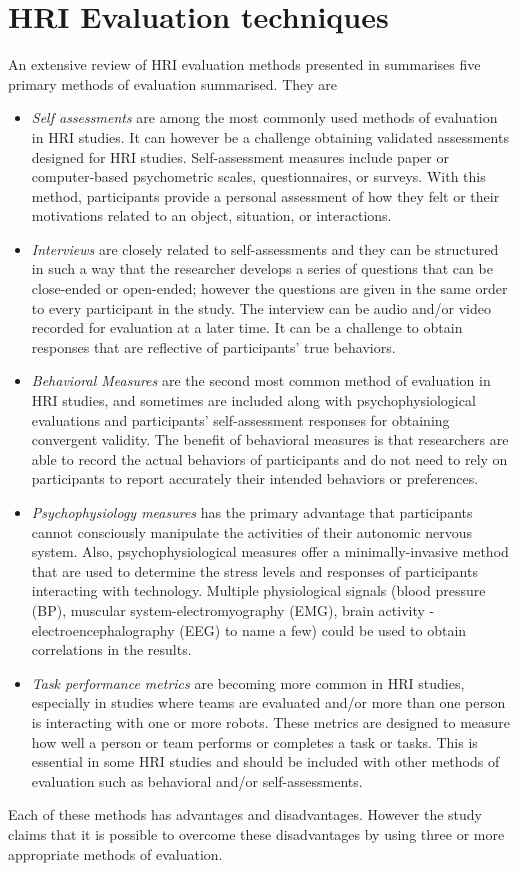 {\section{HRI Evaluation techniques}
	An extensive review of HRI evaluation methods presented in \cite{Bethel2010} summarises five primary methods of evaluation summarised. They are
\begin{itemize}
\item \emph{Self assessments} are among the most commonly used methods of evaluation in HRI studies. It can however be a challenge obtaining validated assessments designed for HRI studies. Self-assessment measures include paper or computer-based psychometric scales, questionnaires, or surveys. With this method, participants provide a personal assessment of how they felt or their motivations related to an object, situation, or interactions.
\item \emph{Interviews} are closely related to self-assessments and they can be structured in such a way that  the researcher develops a series of questions that can be close-ended or open-ended; however the questions are given in the same order to every participant in the study. The interview can be audio and/or video recorded for evaluation at a later time. It can be a challenge to obtain responses that are reflective of participants’ true behaviors.
\item \emph{Behavioral Measures} are the second most common method of evaluation in HRI studies, and sometimes are included along with psychophysiological evaluations and participants’ self-assessment responses for obtaining convergent validity. The benefit of behavioral measures is that researchers are able to record the actual behaviors of participants and do not need to rely on participants to report accurately their intended behaviors or preferences.
\item \emph{Psychophysiology measures} has the primary advantage that participants cannot consciously manipulate the activities of their autonomic nervous system. Also, psychophysiological measures offer a minimally-invasive method that are used to determine the stress levels and responses of participants interacting with technology. Multiple physiological signals (blood pressure (BP), muscular system-electromyography (EMG), brain activity - electroencephalography (EEG) to name a few) could be used to obtain correlations in the results.
\item \emph{Task performance metrics} are becoming more common in HRI studies, especially in studies where teams are evaluated and/or more than one person is interacting with one or more robots. These metrics are designed to measure how well a person or team performs or completes a task or tasks. This is essential in some HRI studies and should be included with other methods of evaluation such as behavioral and/or self-assessments.
\end{itemize}
Each of these methods has advantages and disadvantages. However the study claims that it is possible to overcome these disadvantages by using three or more appropriate methods of evaluation. 

}
